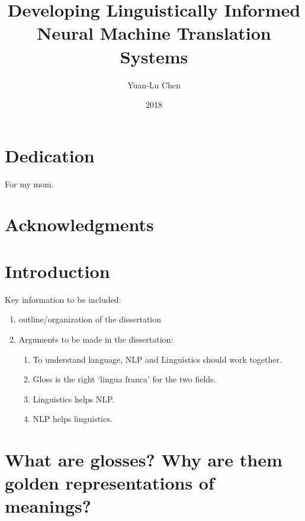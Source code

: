 \documentclass[final]{ua-thesis}
\author{Yuan-Lu Chen}
\title{Developing Linguistically Informed Neural Machine Translation Systems}
\date{2018}
\numberwithin{equation}{section}
\begin{document}


\maketitle

\chapter*{Dedication}
\thispagestyle{topright}
\begin{center}For my mom.\end{center}
\chapter*{Acknowledgments}


\tableofcontents
\listoffigures
\listoftables


%

\printindex

\chapter{Introduction}
\label{chap:Introduction}

Key information to be included:
\begin{enumerate}
\item outline/organization of the dissertation 
\item Arguments to be made in the dissertation: 
	\begin{enumerate}
	\item To understand language, NLP and Linguistics should work together.
    \item  Gloss is the right `lingua franca' for the two fields.
    \item Linguistics helps NLP.
    \item NLP helps linguistics. 
	\end{enumerate}
\end{enumerate}
\chapter{What are glosses? Why are them golden representations of meanings?}
\label{chap:gloss}
\end{document}
